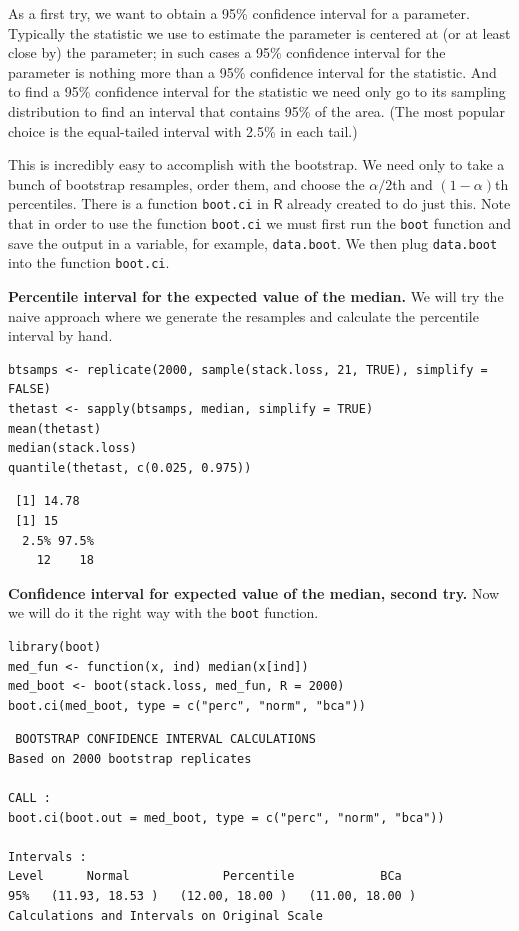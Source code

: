\documentclass[captions=tableheading]{scrbook}
\begin{document}
As a first try, we want to obtain a 95\% confidence interval for a parameter. Typically the statistic we use to estimate the parameter is centered at (or at least close by) the parameter; in such cases a 95\% confidence interval for the parameter is nothing more than a 95\% confidence interval for the statistic. And to find a 95\% confidence interval for the statistic we need only go to its sampling distribution to find an interval that contains 95\% of the area. (The most popular choice is the equal-tailed interval with 2.5\% in each tail.)

This is incredibly easy to accomplish with the bootstrap. We need only to take a bunch of bootstrap resamples, order them, and choose the \(\alpha/2\)th and \((1-\alpha)\)th percentiles. There is a function \texttt{boot.ci} in \(\mathsf{R}\) already created to do just this. Note that in order  to use the function \texttt{boot.ci} we must first run the \texttt{boot} function and save the output in a variable, for example, \texttt{data.boot}. We then plug \texttt{data.boot} into the function \texttt{boot.ci}.


\begin{example}

\textbf{Percentile interval for the expected value of the median.} We will try the naive approach where we generate the resamples and calculate the percentile interval by hand.


\begin{verbatim}
btsamps <- replicate(2000, sample(stack.loss, 21, TRUE), simplify = FALSE)
thetast <- sapply(btsamps, median, simplify = TRUE)
mean(thetast)
median(stack.loss)
quantile(thetast, c(0.025, 0.975))
\end{verbatim}

\begin{verbatim}
 [1] 14.78
 [1] 15
  2.5% 97.5% 
    12    18
\end{verbatim}

\end{example}

\begin{example}
\textbf{Confidence interval for expected value of the median, second try.}  Now we will do it the right way with the \texttt{boot} function.


\begin{verbatim}
library(boot)
med_fun <- function(x, ind) median(x[ind])
med_boot <- boot(stack.loss, med_fun, R = 2000)
boot.ci(med_boot, type = c("perc", "norm", "bca"))
\end{verbatim}


\begin{verbatim}
 BOOTSTRAP CONFIDENCE INTERVAL CALCULATIONS
Based on 2000 bootstrap replicates

CALL : 
boot.ci(boot.out = med_boot, type = c("perc", "norm", "bca"))

Intervals : 
Level      Normal             Percentile            BCa          
95%   (11.93, 18.53 )   (12.00, 18.00 )   (11.00, 18.00 )  
Calculations and Intervals on Original Scale
\end{verbatim}

\end{example}
\end{document}
